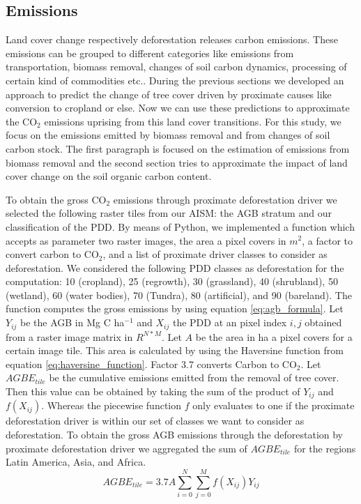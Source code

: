 	\subsection{Emissions}
		Land cover change respectively deforestation releases carbon emissions. These emissions can be grouped to different categories like emissions from transportation, biomass removal, changes of soil carbon dynamics, processing of certain kind of commodities etc.. During the previous sections we developed an approach to predict the change of tree cover driven by proximate causes like conversion to cropland or else. Now we can use these predictions to approximate the CO$_2$ emissions uprising from this land cover transitions. For this study, we focus on the emissions emitted by biomass removal and from changes of soil carbon stock. The first paragraph is focused on the estimation of emissions from biomass removal and the second section tries to approximate the impact of land cover change on the soil organic carbon content. 

		To obtain the gross CO$_2$ emissions through proximate deforestation driver we selected the following raster tiles from our \ac{AISM}: the \ac{AGB} stratum and our classification of the \ac{PDD}. By means of Python, we implemented a function which accepts as parameter two raster images, the area a pixel covers in $m^2$, a factor to convert carbon to CO$_2$, and a list of proximate driver classes to consider as deforestation. We considered the following \ac{PDD} classes as deforestation for the computation: 10 (cropland), 25 (regrowth), 30 (grassland), 40 (shrubland), 50 (wetland), 60 (water bodies), 70 (Tundra), 80 (artificial), and 90 (bareland). The function computes the gross emissions by using  equation \ref{eq:agb_formula}. Let $Y_{ij}$ be the \ac{AGB} in Mg C ha$^{-1}$ and $X_{ij}$ the \ac{PDD} at an pixel index $i,j$ obtained from a raster image matrix in $R^{N*M}$. Let $A$ be the area in ha a pixel covers for a certain image tile. This area is calculated by using the Haversine function from equation \ref{eq:haversine_function}. Factor 3.7 converts Carbon to CO$_2$. Let $AGBE_{tile}$ be the cumulative emissions emitted from the removal of tree cover. Then this value can be obtained by taking the sum of the product of $Y_{ij}$ and $f(X_{ij})$. Whereas the piecewise function $f$ only evaluates to one if the proximate deforestation driver is within our set of classes we want to consider as deforestation. To obtain the gross \ac{AGB} emissions through the deforestation by proximate deforestation driver we aggregated the sum of $AGBE_{tile}$ for the regions Latin America, Asia, and Africa.
		\begin{equation}
		\label{eq:agb_formula}
			AGBE_{tile} = 3.7A\displaystyle\sum_{i=0}^{N}\displaystyle\sum_{j=0}^{M} f(X_{ij})Y_{ij}
		\end{equation}

